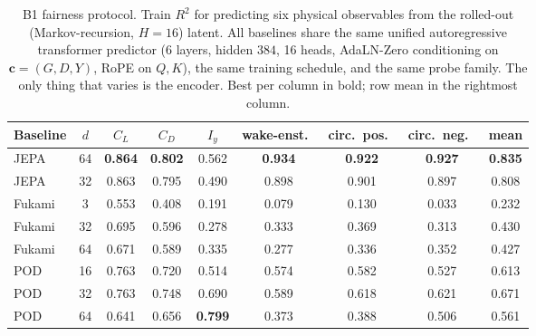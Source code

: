 
\begin{table}
  \centering
  \caption{B1 fairness protocol. Train $R^2$ for predicting six physical observables
  from the rolled-out (Markov-recursion, $H = 16$) latent. All baselines share the
  same unified autoregressive transformer predictor (6 layers, hidden $384$, 16 heads,
  AdaLN-Zero conditioning on $\mathbf{c} = (G, D, Y)$, RoPE on $Q,K$), the same
  training schedule, and the same probe family. The only thing that varies is the
  encoder. Best per column in bold; row mean in the rightmost column.}
  \label{tab:b1_closure_train_r2}
  \small
  \begin{tabular}{l c c c c c c c c}
    \toprule
    Baseline & $d$ & $C_L$ & $C_D$ & $I_y$ & wake-enst.\ & circ.\ pos.\ & circ.\ neg.\ & mean \\
    \midrule
    JEPA   & 64 & \textbf{0.864} & \textbf{0.802} & 0.562 & \textbf{0.934} & \textbf{0.922} & \textbf{0.927} & \textbf{0.835} \\
    JEPA   & 32 & 0.863 & 0.795 & 0.490 & 0.898 & 0.901 & 0.897 & 0.808 \\
    \midrule
    Fukami & 3  & 0.553 & 0.408 & 0.191 & 0.079 & 0.130 & 0.033 & 0.232 \\
    Fukami & 32 & 0.695 & 0.596 & 0.278 & 0.333 & 0.369 & 0.313 & 0.430 \\
    Fukami & 64 & 0.671 & 0.589 & 0.335 & 0.277 & 0.336 & 0.352 & 0.427 \\
    \midrule
    POD    & 16 & 0.763 & 0.720 & 0.514 & 0.574 & 0.582 & 0.527 & 0.613 \\
    POD    & 32 & 0.763 & 0.748 & 0.690 & 0.589 & 0.618 & 0.621 & 0.671 \\
    POD    & 64 & 0.641 & 0.656 & \textbf{0.799} & 0.373 & 0.388 & 0.506 & 0.561 \\
    \bottomrule
  \end{tabular}
\end{table}

